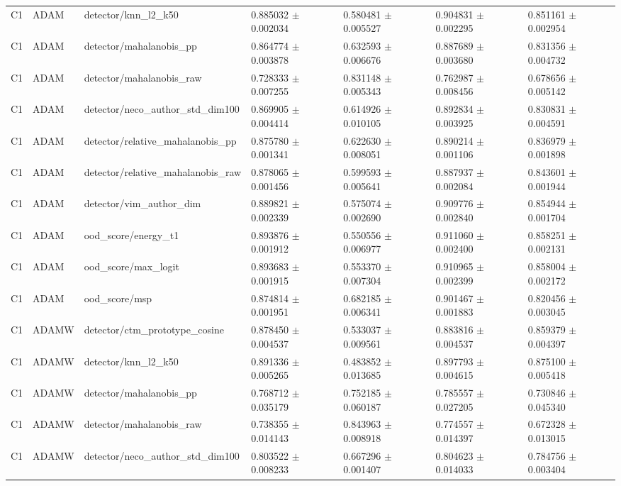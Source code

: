 \begin{longtable}{lllllll}
C1 & ADAM & detector/knn\_l2\_k50 & 0.885032 $\pm$ 0.002034 & 0.580481 $\pm$ 0.005527 & 0.904831 $\pm$ 0.002295 & 0.851161 $\pm$ 0.002954 \\
C1 & ADAM & detector/mahalanobis\_pp & 0.864774 $\pm$ 0.003878 & 0.632593 $\pm$ 0.006676 & 0.887689 $\pm$ 0.003680 & 0.831356 $\pm$ 0.004732 \\
C1 & ADAM & detector/mahalanobis\_raw & 0.728333 $\pm$ 0.007255 & 0.831148 $\pm$ 0.005343 & 0.762987 $\pm$ 0.008456 & 0.678656 $\pm$ 0.005142 \\
C1 & ADAM & detector/neco\_author\_std\_dim100 & 0.869905 $\pm$ 0.004414 & 0.614926 $\pm$ 0.010105 & 0.892834 $\pm$ 0.003925 & 0.830831 $\pm$ 0.004591 \\
C1 & ADAM & detector/relative\_mahalanobis\_pp & 0.875780 $\pm$ 0.001341 & 0.622630 $\pm$ 0.008051 & 0.890214 $\pm$ 0.001106 & 0.836979 $\pm$ 0.001898 \\
C1 & ADAM & detector/relative\_mahalanobis\_raw & 0.878065 $\pm$ 0.001456 & 0.599593 $\pm$ 0.005641 & 0.887937 $\pm$ 0.002084 & 0.843601 $\pm$ 0.001944 \\
C1 & ADAM & detector/vim\_author\_dim & 0.889821 $\pm$ 0.002339 & 0.575074 $\pm$ 0.002690 & 0.909776 $\pm$ 0.002840 & 0.854944 $\pm$ 0.001704 \\
C1 & ADAM & ood\_score/energy\_t1 & 0.893876 $\pm$ 0.001912 & 0.550556 $\pm$ 0.006977 & 0.911060 $\pm$ 0.002400 & 0.858251 $\pm$ 0.002131 \\
C1 & ADAM & ood\_score/max\_logit & 0.893683 $\pm$ 0.001915 & 0.553370 $\pm$ 0.007304 & 0.910965 $\pm$ 0.002399 & 0.858004 $\pm$ 0.002172 \\
C1 & ADAM & ood\_score/msp & 0.874814 $\pm$ 0.001951 & 0.682185 $\pm$ 0.006341 & 0.901467 $\pm$ 0.001883 & 0.820456 $\pm$ 0.003045 \\
C1 & ADAMW & detector/ctm\_prototype\_cosine & 0.878450 $\pm$ 0.004537 & 0.533037 $\pm$ 0.009561 & 0.883816 $\pm$ 0.004537 & 0.859379 $\pm$ 0.004397 \\
C1 & ADAMW & detector/knn\_l2\_k50 & 0.891336 $\pm$ 0.005265 & 0.483852 $\pm$ 0.013685 & 0.897793 $\pm$ 0.004615 & 0.875100 $\pm$ 0.005418 \\
C1 & ADAMW & detector/mahalanobis\_pp & 0.768712 $\pm$ 0.035179 & 0.752185 $\pm$ 0.060187 & 0.785557 $\pm$ 0.027205 & 0.730846 $\pm$ 0.045340 \\
C1 & ADAMW & detector/mahalanobis\_raw & 0.738355 $\pm$ 0.014143 & 0.843963 $\pm$ 0.008918 & 0.774557 $\pm$ 0.014397 & 0.672328 $\pm$ 0.013015 \\
C1 & ADAMW & detector/neco\_author\_std\_dim100 & 0.803522 $\pm$ 0.008233 & 0.667296 $\pm$ 0.001407 & 0.804623 $\pm$ 0.014033 & 0.784756 $\pm$ 0.003404 \\

\end{longtable}

